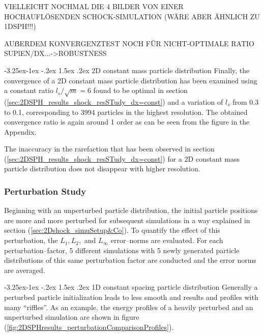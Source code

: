\documentclass{report}
\makeatletter
\renewcommand\paragraph{\@startsection{paragraph}{4}{\z@}%
  {-3.25ex\@plus -1ex \@minus -.2ex}%
  {1.5ex \@plus .2ex}%
  {\normalfont\normalsize\bfseries}}
\makeatother
\begin{document}
VIELLEICHT NOCHMAL DIE 4 BILDER VON EINER HOCHAUFLÖSENDEN SCHOCK-SIMULATION (WÄRE ABER ÄHNLICH ZU 1DSPH!!!)

AUẞERDEM KONVERGENZTEST NOCH FÜR NICHT-OPTIMALE RATIO SUPlEN/DX...->ROBUSTNESS


\paragraph{2D constant mass particle distribution}
Finally, the convergence of a 2D constant mass particle distribution has been examined using a constant ratio $l_s/\sqrt{m}=6$ found to be optimal in section (\ref{sec:2DSPH_results_shock_resSTudy_dx=const}) and a variation of $l_s$ from 0.3 to 0.1, corresponding to 3994 particles in the highest resolution.
The obtained convergence ratio is again around 1 order as can be seen from the figure in the Appendix. 

The inaccuracy in the rarefaction that has been observed in section (\ref{sec:2DSPH_results_shock_resSTudy_dx=const}) for a 2D constant mass particle distribution does not disappear with higher resolution. 
 

\subsubsection{Perturbation Study}
Beginning with an unperturbed particle distribution, the initial particle positions are more and more perturbed for subsequent simulations in a way explained in section (\ref{sec:2Dshock_simuSetup&Co}). To quantify the effect of this perturbation, the $L_1, L_2,$ and $L_{\infty}$ error--norms are evaluated. For each perturbation--factor, 5 different simulations with 5 newly generated particle distributions of this same perturbation factor are conducted and the error norms are averaged.


\paragraph{1D constant spacing particle distribution}
Generally a perturbed particle initialization leads to less smooth and results and profiles with many ``riffles''. As an example, the energy profiles of a heavily perturbed and an unperturbed simulation are shown in figure (\ref{fig:2DSPHresults_perturbationComparisonProfiles}).
\end{document}
